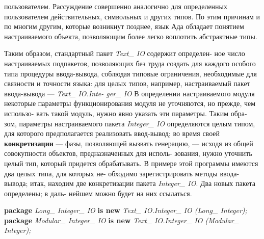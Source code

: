 \newpage

\noindent пользователем. Рассуждение совершенно аналогично для определенных\linebreak
пользователем действительных, символьных и других типов. По этим\linebreak
причинам и по многим другим, которые возникнут позднее, язык Ада\linebreak
обладает понятием настраиваемого объекта, позволяющим более легко\linebreak
воплотить абстрактные типы.

Таким образом, стандартный пакет {\it Text\_ IO} содержит определен­-\linebreak
ное число настраиваемых подпакетов, позволяющих без труда создать\linebreak
для каждого особого типа процедуры ввода-вывода, соблюдая типовые\linebreak
ограничения, необходимые для связности и точности языка: для целых\linebreak
типов, например, настраиваемый пакет ввода-вывода — {\it Text\_ IO.Inte-\linebreak
ger\_ IO} В определении настраиваемого модуля некоторые параметры\linebreak
функционирования модуля не уточняются, но прежде, чем использо­-\linebreak
вать такой модуль, нужно явно указать эти параметры. Таким обра­-\linebreak
зом, параметры настраиваемого пакета {\it Integer\_ IO} определяются целым\linebreak
типом, для которого предполагается реализовать ввод-вывод; во время\linebreak
своей {\bf конкретизации} — фазы, позволяющей вызвать генерацию, —\linebreak
исходя из общей совокупности объектов, предназначенных для исполь­-\linebreak
зования, нужно уточнить целый тип, который придется обрабатывать.\linebreak
В примере этой программы имеются два целых типа, для которых не­-\linebreak
обходимо зарегистрировать методы ввода-вывода; итак, находим две\linebreak
конкретизации пакета {\it Integer\_ IO}. Два новых пакета определены; в даль­-\linebreak
нейшем можно будет на них ссылаться.
\begin{center}
\parbox{14cm}{
{\bf package} {\it Long\_ Integer\_ IO} {\bf is new} {\it Text\_ IO.Integer\_ IO (Long\_ Integer);}\\
{\bf package} {\it Modular\_ Integer\_ IO} {\bf is new} {\it Text\_ IO.Integer\_ IO (Modular\_ Integer);}}
\end{center}
